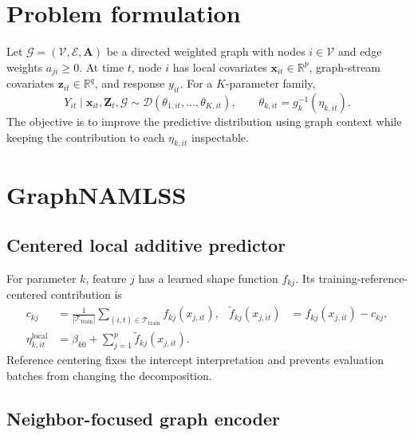 \documentclass[11pt]{article}
\newcommand{\method}{GraphNAMLSS}
\newcommand{\trainset}{\mathcal{T}_{\mathrm{train}}}
\newcommand{\graph}{\mathcal{G}}
\newcommand{\R}{\mathbb{R}}
\begin{document}
\section{Problem formulation}
\label{sec:problem}

Let $\graph=(\mathcal{V},\mathcal{E},\bm{A})$ be a directed weighted graph with
nodes $i\in\mathcal{V}$ and edge weights $a_{ji}\geq 0$. At time $t$, node $i$
has local covariates $\bm{x}_{it}\in\R^p$, graph-stream covariates
$\bm{z}_{it}\in\R^q$, and response $y_{it}$. For a $K$-parameter family,
\begin{equation}
  Y_{it}\mid \bm{x}_{it},\bm{Z}_t,\graph
  \sim \mathcal{D}\!\left(
    \theta_{1,it},\ldots,\theta_{K,it}
  \right),
  \qquad
  \theta_{k,it}=g_k^{-1}(\eta_{k,it}).
  \label{eq:distributional-regression}
\end{equation}
The objective is to improve the predictive distribution using graph context
while keeping the contribution to each $\eta_{k,it}$ inspectable.

\section{\method}
\label{sec:method}

\subsection{Centered local additive predictor}

For parameter $k$, feature $j$ has a learned shape function $f_{kj}$. Its
training-reference-centered contribution is
\begin{align}
  c_{kj}
    &= \frac{1}{|\trainset|}
       \sum_{(i,t)\in\trainset} f_{kj}(x_{j,it}),
  &
  \widetilde f_{kj}(x_{j,it})
    &= f_{kj}(x_{j,it})-c_{kj},                                      \label{eq:local-centering}\\
  \eta^{\mathrm{local}}_{k,it}
    &= \beta_{k0}+\sum_{j=1}^{p}\widetilde f_{kj}(x_{j,it}).          \label{eq:local-predictor}
\end{align}
Reference centering fixes the intercept interpretation and prevents evaluation
batches from changing the decomposition.

\subsection{Neighbor-focused graph encoder}
\end{document}

